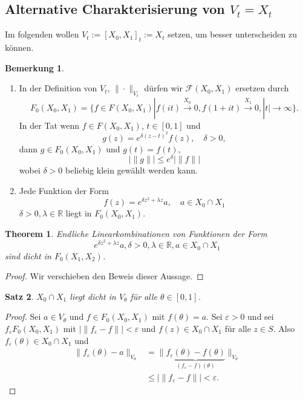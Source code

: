 \documentclass[
paper=a4,
bibtotocnumbered,
liststotocnumbered,
tablecaptionabove,
pointlessnumbers,
twoside,
openright,
10pt
]
{report}
\newtheorem{thm}{Theorem}[chapter]
\newtheorem{satz}[thm]{Satz}
\theoremstyle{definition}
\newtheorem*{rem}{Bemerkung}
\numberwithin{equation}{chapter}
\begin{document}
\subsection{Alternative Charakterisierung von $V_t=X_t$}
Im folgenden wollen $V_t:=[X_0, X_1]_t:=X_t$ setzen, um besser unterscheiden zu können.

\begin{rem}
\begin{enumerate}[1)]
\item In der Definition von $V_t$, $\| \cdot\|_{V_t}$ dürfen wir $\mathcal F(X_0,X_1)$ ersetzen durch
\begin{equation}
F_0 (X_0 ,X_1) = \{ f\in F(X_0,X_1) | f(it) \stackrel{X_0}\to 0, f(1+it) \stackrel{X_1}\to 0, |t|\to \infty\}.
\end{equation}
In der Tat wenn $f\in F(X_0, X_1)$, $t\in [0,1]$ und
\begin{equation}
g(z) = e^{\delta (z-t)^2} f(z), \quad \delta >0,
\end{equation}
dann $g\in F_0(X_0, X_1)$ und $g(t)= f(t)$,
\begin{equation}
|\| g\| | \le e^{\delta} |\| f\| |
\end{equation}
wobei $\delta >0$ beliebig klein gewählt werden kann.
\item Jede Funktion der Form
\begin{equation}
f(z) = e^{\delta z^2 + \lambda z} a, \quad a \in X_0 \cap X_1
\end{equation}
$\delta >0, \lambda \in \mathbb R$ liegt in $F_0(X_0, X_1)$.
\end{enumerate}
\end{rem}
\begin{thm}\label{4.14}
Endliche Linearkombinationen von Funktionen der Form 
\begin{equation}
e^{\delta z^2 + \lambda z} a, \delta >0, \lambda \in \mathbb R, a\in X_0 \cap X_1
\end{equation}
sind dicht in $F_0(X_1, X_2)$.
\end{thm}
\begin{proof}
Wir verschieben den Beweis dieser Aussage.
\end{proof}

\begin{satz}\label{4.15}
$X_0 \cap X_1$ liegt dicht in $V_{\theta}$ für alle $\theta\in [0,1]$.
\end{satz}
\begin{proof}
Sei $a\in V_{\theta}$ und $f\in F_0(X_0, X_1)$ mit $f(\theta)=a$.  Sei $\varepsilon >0$ und sei $f_\varepsilon F_0(X_0, X_1)$ mit $|\| f_\varepsilon -f\| | <\varepsilon$ und $f(z) \in X_0 \cap X_1$ für alle $z\in S$. Also $f_{\varepsilon}(\theta) \in X_0 \cap X_1$ und
\begin{align*}
\| f_{\varepsilon}(\theta) -a\|_{V_\theta} &= \| \underbrace{f_{\varepsilon}(\theta) - f(\theta)}_{(f_\varepsilon -f) (\theta)}\|_{V_\theta}\\
&\le |\| f_\varepsilon-f\| | <\varepsilon.
\end{align*}
\end{proof}
\end{document}
